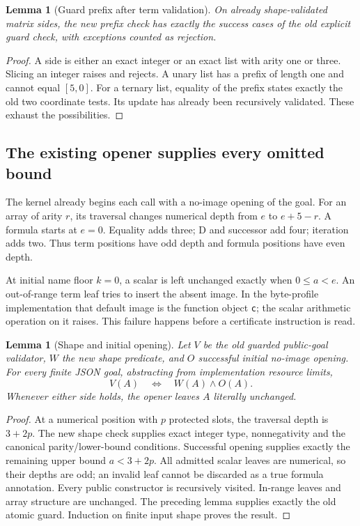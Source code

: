 \documentclass[11pt,letterpaper]{article}
\newtheorem{lemma}[theorem]{Lemma}
\theoremstyle{definition}\newtheorem{definition}[theorem]{Definition}
\theoremstyle{remark}\newtheorem{remark}[theorem]{Remark}
\begin{document}
\begin{lemma}[Guard prefix after term validation]
On already shape-validated matrix sides, the new prefix check has
exactly the success cases of the old explicit guard check, with
exceptions counted as rejection.
\end{lemma}
\begin{proof}
A side is either an exact integer or an exact list with arity one or
three. Slicing an integer raises and rejects. A unary list has a prefix
of length one and cannot equal $[5,0]$. For a ternary list, equality of
the prefix states exactly the old two coordinate tests. Its update
has already been recursively validated. These exhaust the possibilities.
\end{proof}

\subsection{The existing opener supplies every omitted bound}

The kernel already begins each call with a no-image opening of the goal.
For an array of arity $r$, its traversal changes numerical depth from
$e$ to $e+5-r$. A formula starts at $e=0$. Equality adds three;
D and successor add four; iteration adds two. Thus term positions
have odd depth and formula positions have even depth.

At initial name floor $k=0$, a scalar is left unchanged exactly when
$0\le a<e$. An out-of-range term leaf tries to insert the absent image.
In the byte-profile implementation that default image is the function
object \texttt{c}; the scalar arithmetic operation on it raises. This
failure happens before a certificate instruction is read.

\begin{lemma}[Shape and initial opening]
Let $V$ be the old guarded public-goal validator, $W$ the new shape
predicate, and $O$ successful initial no-image opening. For every
finite JSON goal, abstracting from implementation resource limits,
\[
 V(A)\quad\Longleftrightarrow\quad W(A)\land O(A).
\]
Whenever either side holds, the opener leaves $A$ literally unchanged.
\end{lemma}
\begin{proof}
At a numerical position with $p$ protected slots, the traversal depth
is $3+2p$. The new shape check supplies exact integer type,
nonnegativity and the canonical parity/lower-bound conditions. Successful
opening supplies exactly the remaining upper bound $a<3+2p$.
All admitted scalar leaves are numerical, so their depths are odd;
an invalid leaf cannot be discarded as a true formula annotation.
Every public constructor is recursively visited. In-range leaves and
array structure are unchanged. The preceding lemma supplies exactly
the old atomic guard. Induction on finite input shape proves the result.
\end{proof}
\end{document}
